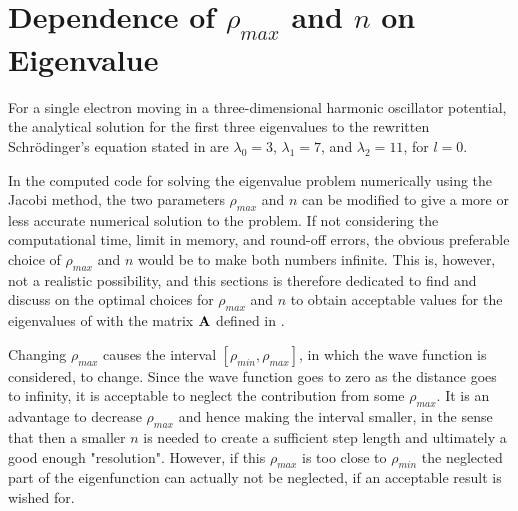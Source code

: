 \section{Dependence of $\rho_{max}$ and $n$ on Eigenvalue}
\label{subsec:DependenceOnEigenvalue}
For a single electron moving in a three-dimensional harmonic oscillator potential, the analytical solution for the first three eigenvalues to the rewritten Schrödinger's equation stated in 
are $\lambda_0 = 3$, $\lambda_1 = 7$, and $\lambda_2 = 11$, for  $l=0$.

In the computed code for solving the eigenvalue problem numerically using the Jacobi method, the two parameters $\rho_{max}$ and $n$ can be modified to give a more or less accurate numerical solution to the problem.
If not considering the computational time, limit in memory, and round-off errors, the obvious preferable choice of $\rho_{max}$ and $n$ would be to make both numbers infinite. 
This is, however, not a realistic possibility, and this sections is therefore dedicated to find and discuss on the optimal choices for $\rho_{max}$ and $n$ to obtain acceptable values for the eigenvalues of  with the matrix $\mbox{\textbf{A}}$ defined in .

Changing $\rho_{max}$ causes the interval $[\rho_{min}, \rho_{max}]$, in which the wave function is considered, to change. 
Since the wave function goes to zero as the distance goes to infinity, it is acceptable to neglect the contribution from some $\rho_{max}$. 
It is an advantage to decrease $\rho_{max}$ and hence making the interval smaller, in the sense that then a smaller $n$ is needed to create a sufficient step length and ultimately a good enough "resolution". 
However, if this $\rho_{max}$ is too close to $\rho_{min}$ the neglected part of the eigenfunction can actually not be neglected, if an acceptable result is wished for. 

